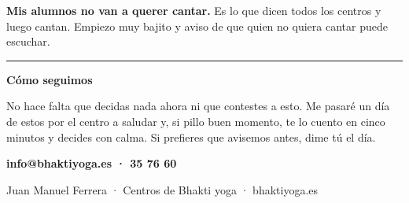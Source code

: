 \documentclass[11pt,a4paper]{article}
\begin{document}
\textbf{Mis alumnos no van a querer cantar.} Es lo que dicen todos los centros y
luego cantan. Empiezo muy bajito y aviso de que quien no quiera cantar puede
escuchar.

\vspace{0.6em}
{\color{ocre}\rule{\textwidth}{1.6pt}}
\vspace{0.6em}

{\titular\bfseries\fontsize{14}{17}\selectfont\color{ocre} Cómo seguimos\par}

\vspace{0.3em}
No hace falta que decidas nada ahora ni que contestes a esto. Me pasaré un día
de estos por el centro a saludar y, si pillo buen momento, te lo cuento en cinco
minutos y decides con calma. Si prefieres que avisemos antes, dime tú el día.

\vspace{0.5em}
{\titular\bfseries\fontsize{13}{16}\selectfont info@bhaktiyoga.es \quad· 35 76 60\par}

\vspace{0.3em}
{\fontsize{10}{12}\selectfont\color{gris}Juan Manuel Ferrera · Centros de Bhakti yoga · bhaktiyoga.es}
\end{document}
